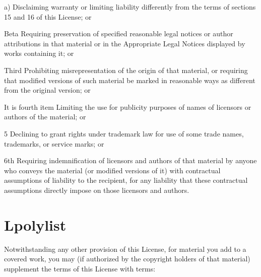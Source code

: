 \documentclass{article}
\begin{document}
\begin{Rautolist}

\item[a)] Disclaiming warranty or limiting liability differently from the terms of sections 15 and 16 of this License; or

\item[Beta] Requiring preservation of specified reasonable legal notices or author attributions in that material or in the Appropriate Legal Notices displayed by works containing it; or

\item[Third] Prohibiting misrepresentation of the origin of that material, or requiring that modified versions of such material be marked in reasonable ways as different from the original version; or

\item[It is fourth item] Limiting the use for publicity purposes of names of licensors or authors of the material; or

\item[5] Declining to grant rights under trademark law for use of some trade names, trademarks, or service marks; or

\item[6th] Requiring indemnification of licensors and authors of that material by anyone who conveys the material (or modified versions of it) with contractual assumptions of liability to the recipient, for any liability that these contractual assumptions directly impose on those licensors and authors.

\end{Rautolist}

\section{Lpolylist}

Notwithstanding any other provision of this License, for material you add to a covered work, you may (if authorized by the copyright holders of that material) supplement the terms of this License with terms:
\end{document}
